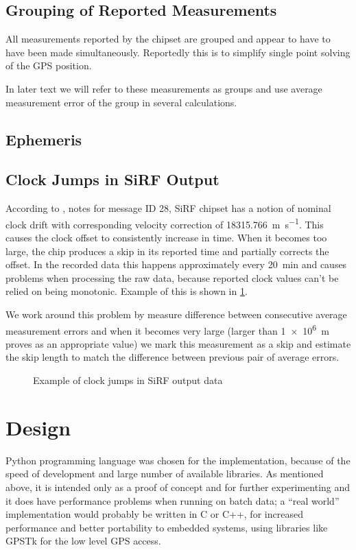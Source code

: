 \subsection{Grouping of Reported Measurements}
\label{sec:impl-sirf-grouping}
All measurements reported by the chipset are grouped and appear
to have to have been made simultaneously.
Reportedly this is to simplify single point solving of the GPS position.

In later text we will refer to these measurements as groups and use average
measurement error of the group in several calculations.

\subsection{Ephemeris}
\label{sec:impl-sirf-ephemeris}
\todo{!!!}

\subsection{Clock Jumps in SiRF Output}
\label{sec:impl-sirf-jumps}
According to \cite{sirf-protocol}, notes for message ID 28, SiRF chipset has a
notion of nominal clock drift with corresponding velocity correction of \SI{18315.766}{\meter\per\second}.
This causes the clock offset to consistently increase in time.
When it becomes too large, the chip produces a skip in its reported time and
partially corrects the offset.
In the recorded data this happens approximately every \SI{20}{\minute} and causes
problems when processing the raw data, because reported clock values
can't be relied on being monotonic.
Example of this is shown in \cref{fig:impl-clock-jumps}.

We work around this problem by measure difference between consecutive average
measurement errors and when it becomes very large (larger than \SI{1e6}{\meter} proves as an
appropriate value) we mark this measurement as a skip and estimate the skip
length to match the difference between previous pair of average errors.

\begin{figure}[tp]
	\centering
	\caption{Example of clock jumps in SiRF output data}
	\label{fig:impl-clock-jumps}
\end{figure}

\section{Design}
Python programming language was chosen for the implementation,
because of the speed of development and large number of available libraries.
As mentioned above, it is intended only as a proof of
concept and for further experimenting and it does have performance problems
when running on batch data; a \enquote{real world} implementation
would probably be written in C or C++, for increased performance and better portability
to embedded systems, using libraries like GPSTk \cite{tolman04} for the low level GPS access.

